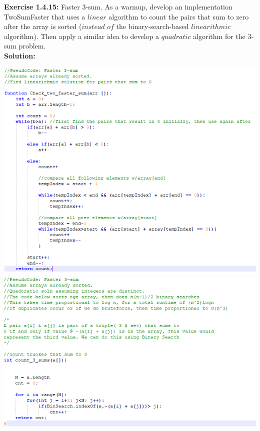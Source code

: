 \documentclass[11pt,fleqn]{article}
\begin{document}
\textbf{Exercise 1.4.15:} Faster 3-sum. As a warmup, develop an implementation TwoSumFaster that
uses a $linear$ algorithm to count the pairs that sum to zero after the array is sorted ($instead$
$of$ the binary-search-based $linearithmic$ algorithm). Then apply a similar idea to
develop a $quadratic$ algorithm for the 3-sum problem.\\

\textbf{Solution:}
\begin{center}
	\includegraphics[scale = 1]{1.4.15-code.png}
	\includegraphics[scale = 1]{1.4.15-code2.png}
	\end{center}
\end{document}
